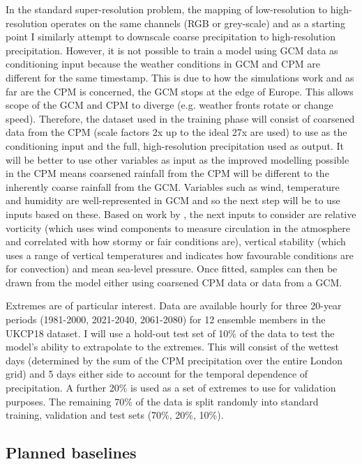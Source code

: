 In the standard super-resolution problem, the mapping of low-resolution to high-resolution operates on the same channels (RGB or grey-scale) and as a starting point I similarly attempt to downscale coarse precipitation to high-resolution precipitation. However, it is not possible to train a model using GCM data as conditioning input because the weather conditions in GCM and CPM are different for the same timestamp. This is due to how the simulations work and as far are the CPM is concerned, the GCM stops at the edge of Europe. This allows scope of the GCM and CPM to diverge (e.g. weather fronts rotate or change speed). Therefore, the dataset used in the training phase will consist of coarsened data from the CPM (scale factors 2x up to the ideal 27x are used) to use as the conditioning input and the full, high-resolution precipitation used as output. It will be better to use other variables as input as the improved modelling possible in the CPM means coarsened rainfall from the CPM will be different to the inherently coarse rainfall from the GCM. Variables such as wind, temperature and humidity are well-represented in GCM and so the next step will be to use inputs based on these. Based on work by \textcite{chan2018precippredictors}, the next inputs to consider are relative vorticity (which uses wind components to measure circulation in the atmosphere and correlated with how stormy or fair conditions are), vertical stability (which uses a range of vertical temperatures and indicates how favourable conditions are for convection) and mean sea-level pressure. Once fitted, samples can then be drawn from the model either using coarsened CPM data or data from a GCM.

Extremes are of particular interest. Data are available hourly for three 20-year periods (1981-2000, 2021-2040, 2061-2080) for 12 ensemble members in the UKCP18 dataset. I will use a hold-out test set of 10\% of the data to test the model's ability to extrapolate to the extremes. This will consist of the wettest days (determined by the sum of the CPM precipitation over the entire London grid) and 5 days either side to account for the temporal dependence of precipitation. A further 20\% is used as a set of extremes to use for validation purposes. The remaining 70\% of the data is split randomly into standard training, validation and test sets (70\%, 20\%, 10\%).

\subsection{Planned baselines} \label{sec:emulatorstudy:baselines}


